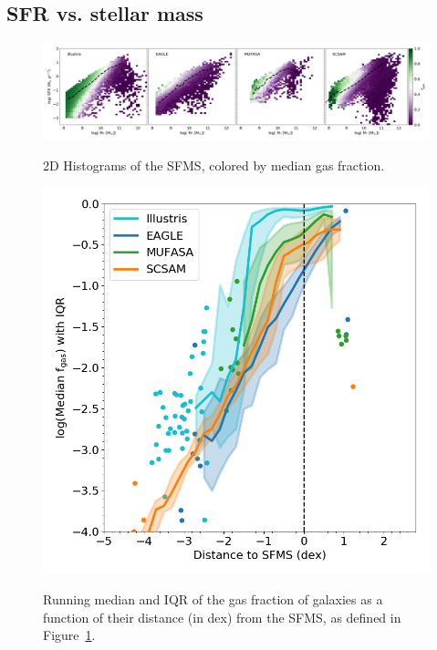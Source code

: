 \documentclass[fleqn,usenatbib]{mnras}
\begin{document}
\subsection{SFR vs. stellar mass}
\label{sec:results:SFMS fgas}


\begin{figure}
\includegraphics[width = 0.99\linewidth]{SFMS_fits_2dhist_median.png}\\
\caption{2D Histograms of the SFMS, colored by median gas fraction. }
\label{fig:SFMS fgas}
\end{figure}


\begin{figure}
\includegraphics[width = 0.99\linewidth]{fgas_DSFMS_binned_IQR_logged.png}\\
\caption{Running median and IQR of the gas fraction of galaxies as a function of their distance (in dex) from the SFMS, as defined in Figure~\ref{fig:SFMS fgas}.}
\label{fig:fgas DSFMS}
\end{figure}
\end{document}
